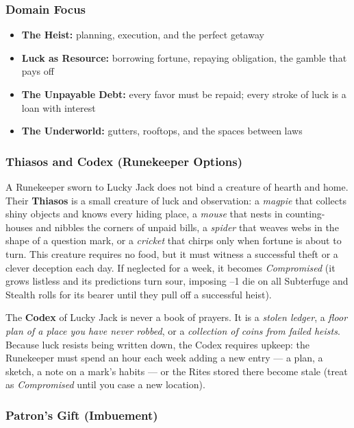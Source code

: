 \subsubsection*{Domain Focus}
\begin{itemize}
  \item \textbf{The Heist:} planning, execution, and the perfect getaway
  \item \textbf{Luck as Resource:} borrowing fortune, repaying obligation, the gamble that pays off
  \item \textbf{The Unpayable Debt:} every favor must be repaid; every stroke of luck is a loan with interest
  \item \textbf{The Underworld:} gutters, rooftops, and the spaces between laws
\end{itemize}

\subsubsection*{Thiasos and Codex (Runekeeper Options)}

A Runekeeper sworn to Lucky Jack does not bind a creature of hearth and home. Their \textbf{Thiasos} is a small creature of luck and observation: a \textit{magpie} that collects shiny objects and knows every hiding place, a \textit{mouse} that nests in counting-houses and nibbles the corners of unpaid bills, a \textit{spider} that weaves webs in the shape of a question mark, or a \textit{cricket} that chirps only when fortune is about to turn. This creature requires no food, but it must witness a successful theft or a clever deception each day. If neglected for a week, it becomes \textit{Compromised} (it grows listless and its predictions turn sour, imposing --1 die on all Subterfuge and Stealth rolls for its bearer until they pull off a successful heist).

The \textbf{Codex} of Lucky Jack is never a book of prayers. It is a \textit{stolen ledger}, a \textit{floor plan of a place you have never robbed}, or a \textit{collection of coins from failed heists}. Because luck resists being written down, the Codex requires upkeep: the Runekeeper must spend an hour each week adding a new entry --- a plan, a sketch, a note on a mark's habits --- or the Rites stored there become stale (treat as \textit{Compromised} until you case a new location).

\subsubsection*{Patron's Gift (Imbuement)}

